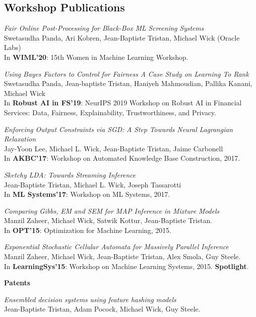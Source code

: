 \documentclass[margin,line]{res}
\begin{document}
\begin{resume}
\section{\sc Workshop Publications}

\emph{Fair Online Post-Processing for Black-Box ML Screening Systems}\\
Swetasudha Panda, Ari Kobren, Jean-Baptiste Tristan, Michael Wick (Oracle Labs)\\
In {\bf WIML'20}: 15th Women in Machine Learning Workshop.

\emph{Using Bayes Factors to Control for Fairness A Case Study on Learning To Rank}\\
Swetasudha Panda, Jean-baptiste Tristan, Haniyeh Mahmoudian, Pallika Kanani, Michael Wick\\
In {\bf Robust AI in FS'19}: NeurIPS 2019 Workshop on Robust AI in Financial Services: Data, Fairness, Explainability, Trustworthiness, and Privacy.

\emph{Enforcing Output Constraints via SGD: A Step Towards Neural Lagrangian Relaxation}\\
Jay-Yoon Lee, Michael L. Wick, Jean-Baptiste Tristan, Jaime Carbonell\\
In {\bf AKBC'17}: Workshop on Automated Knowledge Base Construction, 2017.

\emph{Sketchy LDA: Towards Streaming Inference}\\
Jean-Baptiste Tristan, Michael L. Wick, Joseph Tassarotti\\
In {\bf ML Systems'17}: Workshop on ML Systems, 2017.


\emph{Comparing Gibbs, EM and SEM for MAP Inference in Mixture Models}\\
Manzil Zaheer, Michael Wick, Satwik Kottur, Jean-Baptiste Tristan.\\
In {\bf OPT'15}: Optimization for Machine Learning, 2015. 

\emph{Exponential Stochastic Cellular Automata for Massively Parallel Inference}\\
Manzil Zaheer, Michael Wick, Jean-Baptiste Tristan, Alex Smola, Guy Steele.\\
In {\bf LearningSys'15}: Workshop on Machine Learning Systems, 2015. {\bf Spotlight}. 

\newpage
  {\bf {\Large Patents}}

\emph{Ensembled decision systems using feature hashing models}\\
Jean-Baptiste Tristan, Adam Pocock, Michael Wick, Guy Steele.


\end{resume}
\end{document}
